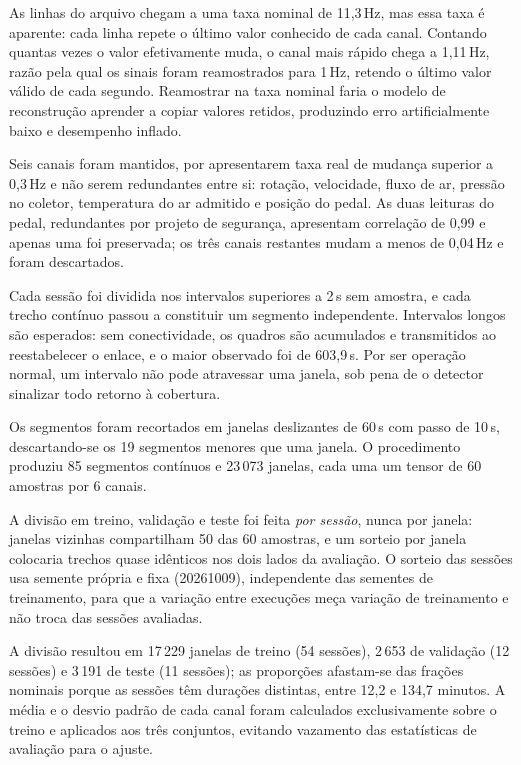 \documentclass[conference]{IEEEtran}
\begin{document}
As linhas do arquivo chegam a uma taxa nominal de 11,3\,Hz, mas essa taxa é aparente: cada linha repete o último valor conhecido de cada canal.
Contando quantas vezes o valor efetivamente muda, o canal mais rápido chega a 1,11\,Hz, razão pela qual os sinais foram reamostrados para 1\,Hz, retendo o último valor válido de cada segundo.
Reamostrar na taxa nominal faria o modelo de reconstrução aprender a copiar valores retidos, produzindo erro artificialmente baixo e desempenho inflado.

Seis canais foram mantidos, por apresentarem taxa real de mudança superior a 0,3\,Hz e não serem redundantes entre si: rotação, velocidade, fluxo de ar, pressão no coletor, temperatura do ar admitido e posição do pedal.
As duas leituras do pedal, redundantes por projeto de segurança, apresentam correlação de 0,99 e apenas uma foi preservada; os três canais restantes mudam a menos de 0,04\,Hz e foram descartados.


Cada sessão foi dividida nos intervalos superiores a 2\,s sem amostra, e cada trecho contínuo passou a constituir um segmento independente.
Intervalos longos são esperados: sem conectividade, os quadros são acumulados e transmitidos ao reestabelecer o enlace, e o maior observado foi de 603,9\,s.
Por ser operação normal, um intervalo não pode atravessar uma janela, sob pena de o detector sinalizar todo retorno à cobertura.

Os segmentos foram recortados em janelas deslizantes de 60\,s com passo de 10\,s, descartando-se os 19 segmentos menores que uma janela.
O procedimento produziu 85 segmentos contínuos e 23\,073 janelas, cada uma um tensor de 60 amostras por 6 canais.


A divisão em treino, validação e teste foi feita \emph{por sessão}, nunca por janela: janelas vizinhas compartilham 50 das 60 amostras, e um sorteio por janela colocaria trechos quase idênticos nos dois lados da avaliação.
O sorteio das sessões usa semente própria e fixa (20261009), independente das sementes de treinamento, para que a variação entre execuções meça variação de treinamento e não troca das sessões avaliadas.

A divisão resultou em 17\,229 janelas de treino (54 sessões), 2\,653 de validação (12 sessões) e 3\,191 de teste (11 sessões); as proporções afastam-se das frações nominais porque as sessões têm durações distintas, entre 12,2 e 134,7 minutos.
A média e o desvio padrão de cada canal foram calculados exclusivamente sobre o treino e aplicados aos três conjuntos, evitando vazamento das estatísticas de avaliação para o ajuste.
\end{document}
